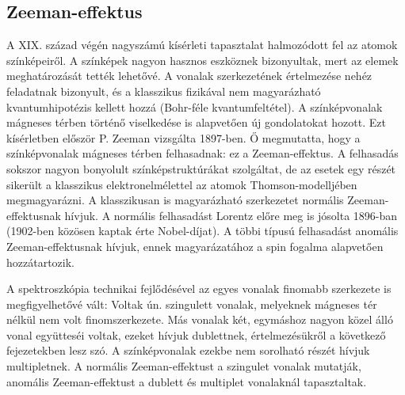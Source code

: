\documentclass[a4paper,12pt]{article}
\begin{document}
\subsection{Zeeman-effektus}
A XIX. század végén nagyszámú kísérleti tapasztalat halmozódott fel az
atomok színképeiről.
A színképek nagyon hasznos eszköznek bizonyultak, mert az elemek
meghatározását tették lehetővé.
A vonalak szerkezetének értelmezése nehéz feladatnak bizonyult, és a
klasszikus fizikával nem magyarázható kvantumhipotézis kellett hozzá
(Bohr-féle kvantumfeltétel).
A színképvonalak mágneses térben történő viselkedése is alapvetően új
gondolatokat hozott.
Ezt kísérletben először P. Zeeman vizsgálta 1897-ben.
Ő megmutatta, hogy a színképvonalak mágneses térben felhasadnak: ez a
Zeeman-effektus.
A felhasadás sokszor nagyon bonyolult színképstruktúrákat szolgáltat,
de az esetek egy részét sikerült a klasszikus elektronelmélettel az
atomok Thomson-modelljében megmagyarázni.
A klasszikusan is magyarázható szerkezetet normális Zeeman-effektusnak
hívjuk.
A normális felhasadást Lorentz előre meg is jósolta 1896-ban
(1902-ben közösen kaptak érte Nobel-díjat).
A többi típusú felhasadást anomális Zeeman-effektusnak hívjuk, ennek
magyarázatához a spin fogalma alapvetően hozzátartozik.

A spektroszkópia technikai fejlődésével az egyes vonalak finomabb
szerkezete is megfigyelhetővé vált: Voltak ún. szingulett vonalak,
melyeknek mágneses tér nélkül nem volt finomszerkezete.
Más vonalak két, egymáshoz nagyon közel álló vonal együtteséi voltak,
ezeket hívjuk dublettnek, értelmezésükről a következő fejezetekben lesz szó.
A színképvonalak ezekbe nem sorolható részét hívjuk multipletnek.
A normális Zeeman-effektust a szingulet vonalak mutatják, anomális
Zeeman-effektust a dublett és multiplet vonalaknál tapasztaltak.
\end{document}
